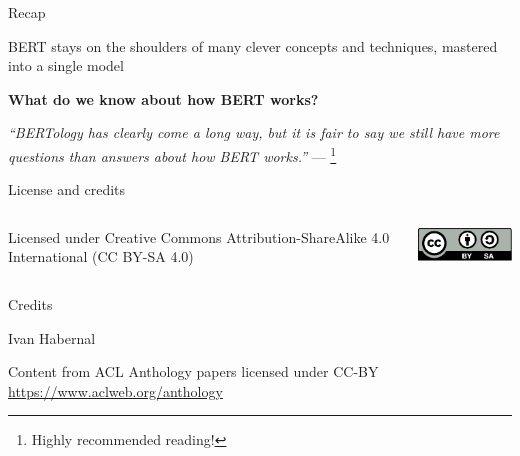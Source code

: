 \documentclass[12pt,aspectratio=169,handout]{beamer}
\begin{document}
\begin{frame}{Recap}
	
	BERT stays on the shoulders of many clever concepts and techniques, mastered into a single model
	
\textbf{What do we know about how BERT works?}

	
\emph{``BERTology has clearly come a long way, but it is fair to say we still have more questions than answers about how BERT works.''} --- \citet{Rogers.et.al.2020.BERT}\footnote{Highly recommended reading!}
	
	
	
\end{frame}











	







\begin{frame}{License and credits}

	\begin{columns}
		\begin{column}{0.7\textwidth}
			Licensed under Creative Commons Attribution-ShareAlike 4.0 International (CC BY-SA 4.0)
		\end{column}
		\begin{column}{0.2\textwidth}
			\includegraphics[width=0.9\linewidth]{img/cc-by-sa-icon.pdf}
		\end{column}
	\end{columns}
	
	\bigskip
	
	Credits
	
	\begin{scriptsize}
		
		Ivan Habernal
		
		Content from ACL Anthology papers licensed under CC-BY \url{https://www.aclweb.org/anthology}
		
	
	\end{scriptsize}
	
\end{frame}
\end{document}
